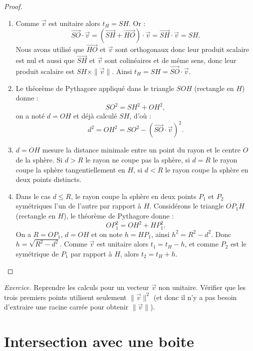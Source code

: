 \documentclass[11pt,class=report,crop=false]{standalone}
\begin{document}
\begin{proof}
~

\begin{enumerate}
  \item Comme $\vec v$ est unitaire alors $t_H =  SH$.
  Or :
  $$ \overrightarrow{SO} \cdot \vec v = \left(\overrightarrow{SH} + \overrightarrow{HO} \right) \cdot \vec v = \overrightarrow{SH} \cdot \vec v = SH.$$
  Nous avons utilisé que $\overrightarrow{HO}$ et  $\vec v$ sont orthogonaux donc leur produit scalaire est nul et aussi que  $\overrightarrow{SH}$ et  $\vec v$ sont colinéaires et de même sens, donc leur produit scalaire est $SH \times \|\vec v\|$.
  Ainsi $t_H = SH =  \overrightarrow{SO} \cdot \vec v$.

  \item Le théorème de Pythagore appliqué dans le triangle $SOH$ (rectangle en $H$) donne :
  $$SO^2 = SH^2 + OH^2,$$
  on a noté $d=OH$ et déjà calculé $SH$, d'où :
  $$d^2 = OH^2 = SO^2 - \left(\overrightarrow{SO}\cdot\vec{v}\right)^2.$$

  \item $d = OH$ mesure la distance minimale entre un point du rayon et le centre $O$ de la sphère. Si $d > R$ le rayon ne coupe pas la sphère, si $d=R$ le rayon coupe la sphère tangentiellement en $H$, si $d<R$ le rayon coupe la sphère en deux points distincts.

  \item Dans le cas $d \le R$, le rayon coupe la sphère en deux points $P_1$ et $P_2$ symétriques l'un de l'autre par rapport à $H$. Considérons le triangle $OP_1H$ (rectangle en $H$), le théorème de Pythagore donne :
  $$OP_1^2 = OH^2 + HP_1^2.$$
  On a $R = OP_1$, $d=OH$ et on note $h = HP_1$, ainsi $h^2 = R^2-d^2$. Donc $h = \sqrt{R^2-d^2}$. 
  Comme $\vec v$ est unitaire alors $t_1 = t_H - h$, et comme $P_2$ est le symétrique de $P_1$ par rapport à $H$, alors $t_2 = t_H + h$.

\end{enumerate} 
 
\end{proof}

\emph{Exercice.} Reprendre les calculs pour un vecteur $\vec v$ non unitaire. Vérifier que les trois premiers points utilisent seulement $\|\vec v\|^2$ (et donc il n'y a pas besoin d'extraire une racine carrée pour obtenir $\|\vec v\|$).



\section{Intersection avec une boite}
\end{document}
